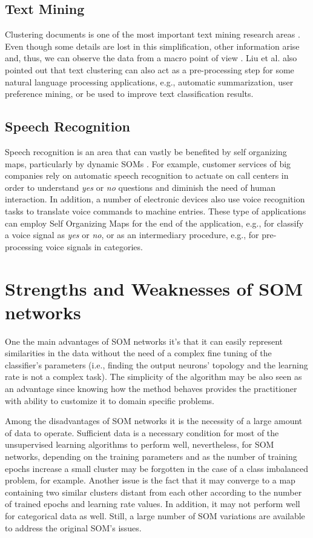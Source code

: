 \subsection{Text Mining}

Clustering documents is one of the most important text mining research areas \cite{txtmin1}\cite{txtmin2}\cite{txtmin3}. Even though some details are lost in this simplification, other information arise and, thus, we can observe the data from a macro point of view \cite{Liu12}. Liu et al. \cite{Liu12} also pointed out that text clustering can also act as a pre-processing step for some natural language processing applications, e.g., automatic summarization, user preference mining, or be used to improve text classification results. 

\subsection{Speech Recognition}

Speech recognition is an area that can vastly be benefited by self organizing maps, particularly by dynamic SOMs \cite{sp1}\cite{sp2}\cite{sp3}. For example, customer services of big companies rely on automatic speech recognition to actuate on call centers in order to understand \textit{yes} or \textit{no} questions and diminish the need of human interaction. In addition, a number of electronic devices also use voice recognition tasks to translate voice commands to machine entries. These type of applications can employ Self Organizing Maps for the end of the application, e.g., for classify a voice signal as \textit{yes} or \textit{no}, or as an intermediary procedure, e.g., for pre-processing voice signals in categories. 

\section{Strengths and Weaknesses of SOM networks}

One the main advantages of SOM networks it's that it can easily represent similarities in the data without the need of a complex fine tuning of the classifier's parameters (i.e., finding the output neurons' topology and the learning rate is not a complex task). The simplicity of the algorithm may be also seen as an advantage since knowing how the method behaves provides the practitioner with ability to customize it to domain specific problems. 

Among the disadvantages of SOM networks it is the necessity of a large amount of data to operate. Sufficient data is a necessary condition for most of the unsupervised learning algorithms to perform well, nevertheless, for SOM networks, depending on the training parameters and as the number of training epochs increase a small cluster may be forgotten in the case of a class imbalanced problem, for example. Another issue is the fact that it may converge to a map containing two similar clusters distant from each other according to the number of trained epochs and learning rate values. In addition, it may not perform well for categorical data as well. Still, a large number of SOM variations are available to address the original SOM's issues. 

